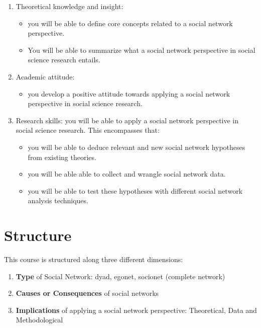 \documentclass[
]{book}
\providecommand{\tightlist}{%
  \setlength{\itemsep}{0pt}\setlength{\parskip}{0pt}}
\begin{document}
\begin{enumerate}
\def\labelenumi{\arabic{enumi}.}
\tightlist
\item
  Theoretical knowledge and insight:

  \begin{itemize}
  \tightlist
  \item
    you will be able to define core concepts related to a social network perspective.\\
  \item
    You will be able to summarize what a social network perspective in social science research entails.\\
  \end{itemize}
\item
  Academic attitude:\\

  \begin{itemize}
  \tightlist
  \item
    you develop a positive attitude towards applying a social network perspective in social science research.\\
  \end{itemize}
\item
  Research skills: you will be able to apply a social network perspective in social science research. This encompasses that:\\

  \begin{itemize}
  \tightlist
  \item
    you will be able to deduce relevant and new social network hypotheses from existing theories.\\
  \item
    you will be able able to collect and wrangle social network data.\\
  \item
    you will be able to test these hypotheses with different social network analysis techniques.\\
  \end{itemize}
\end{enumerate}

\hypertarget{structure}{%
\section{Structure}\label{structure}}

This course is structured along three different dimensions:

\begin{enumerate}
\def\labelenumi{\arabic{enumi}.}
\tightlist
\item
  \textbf{Type} of Social Network: dyad, egonet, socionet (complete network)\\
\item
  \textbf{Causes or Consequences} of social networks
\item
  \textbf{Implications} of applying a social network perspective: Theoretical, Data and Methodological
\end{enumerate}
\end{document}
